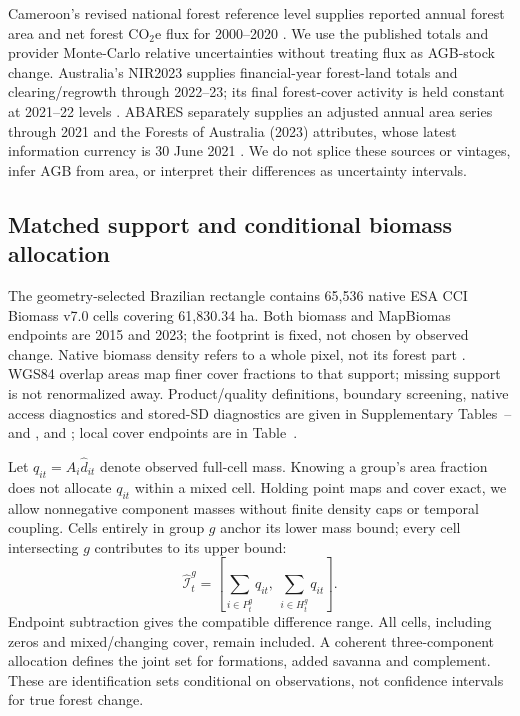 \documentclass[11pt,a4paper]{article}
\begin{document}
Cameroon's revised national forest reference level supplies reported annual forest area and net forest CO$_2$e flux for 2000--2020 \citep{CameroonFRL2026}. We use the published totals and provider Monte-Carlo relative uncertainties without treating flux as AGB-stock change. Australia's NIR2023 supplies financial-year forest-land totals and clearing/regrowth through 2022--23; its final forest-cover activity is held constant at 2021--22 levels \citep{AustraliaNIR2023a,AustraliaNIR2023b}. ABARES separately supplies an adjusted annual area series through 2021 and the Forests of Australia (2023) attributes, whose latest information currency is 30 June 2021 \citep{ABARES2023change,ABARES2023forest}. We do not splice these sources or vintages, infer AGB from area, or interpret their differences as uncertainty intervals.

\subsection{Matched support and conditional biomass allocation}
The geometry-selected Brazilian rectangle contains 65,536 native ESA CCI Biomass v7.0 cells covering 61,830.34 ha. Both biomass and MapBiomas endpoints are 2015 and 2023; the footprint is fixed, not chosen by observed change. Native biomass density refers to a whole pixel, not its forest part \citep{SantoroCartus2026,PUG2026}. WGS84 overlap areas map finer cover fractions to that support; missing support is not renormalized away. Product/quality definitions, boundary screening, native access diagnostics and stored-SD diagnostics are given in Supplementary Tables~-- and ,  and ; local cover endpoints are in Table~.

Let $q_{it}=A_i\widehat d_{it}$ denote observed full-cell mass. Knowing a group's area fraction does not allocate $q_{it}$ within a mixed cell. Holding point maps and cover exact, we allow nonnegative component masses without finite density caps or temporal coupling. Cells entirely in group $g$ anchor its lower mass bound; every cell intersecting $g$ contributes to its upper bound:
\begin{equation}
\widehat{\mathcal I}_t^g=\left[\sum_{i\in P_t^g}q_{it},\ \sum_{i\in H_t^g}q_{it}\right].\label{eq:allocationmain}
\end{equation}
Endpoint subtraction gives the compatible difference range. All cells, including zeros and mixed/changing cover, remain included. A coherent three-component allocation defines the joint set for formations, added savanna and complement. These are identification sets conditional on observations, not confidence intervals for true forest change.
\end{document}
